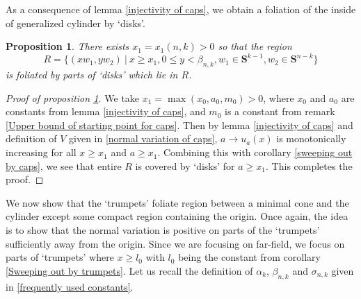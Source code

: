 \documentclass[pdflatex,sn-mathphys-num]{sn-jnl}
\newtheorem{proposition}[theorem]{Proposition}
\begin{document}
As a consequence of lemma \ref{injectivity of caps}, we obtain a foliation of the inside of generalized cylinder by `disks'.
\begin{proposition}\label{Foliation by lower caps}
    There exists $x_1 = x_1(n,k) > 0$ so that the region $$R = \{(xw_1, yw_2) \ | \ x \geq x_1, 0 \leq y < \beta_{n,k} , w_1 \in \mathbf{S}^{k-1}, w_2 \in \mathbf{S}^{n-k}\}$$ is foliated by parts of `disks' which lie in $R$. 
\end{proposition}
\begin{proof}[Proof of proposition \ref{Foliation by lower caps}]
    We take $x_1 = \max(x_0, a_0, m_0) > 0$, where $x_0$ and $a_0$ are constants from lemma \ref{injectivity of caps}, and $m_0$ is a constant from remark \ref{Upper bound of starting point for caps}. Then by lemma \ref{injectivity of caps} and definition of $V$ given in \eqref{normal variation of caps}, $a \to u_{a}(x)$ is monotonically increasing for all $x \geq x_1$ and $a \geq x_1$. Combining this with corollary \ref{sweeping out by caps}, we see that entire $R$ is covered by `disks' for $a \geq x_1$. This completes the proof.  
\end{proof}

We now show that the `trumpets' foliate region between a minimal cone and the cylinder except some compact region containing the origin. Once again, the idea is to show that the normal variation is positive on parts of the `trumpets' sufficiently away from the origin. Since we are focusing on far-field, we focus on parts of `trumpets' where $x \geq l_0$ with $l_0$ being the constant from corollary \ref{Sweeping out by trumpets}. Let us recall the definition of $\alpha_k$, $\beta_{n,k}$ and $\sigma_{n,k}$ given in \eqref{frequently used constants}. \\
\end{document}
